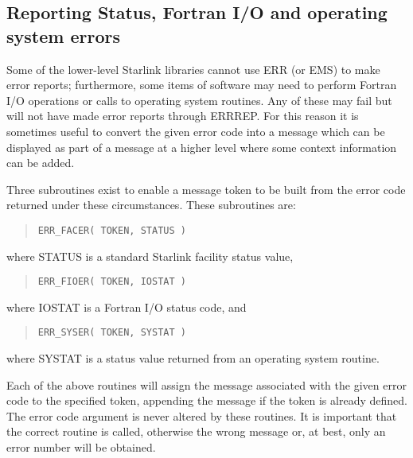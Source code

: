 \documentclass[twoside,11pt]{article}
\newcommand{\xlabel}[1]{}
\renewcommand{\_}{\texttt{\symbol{95}}}
\begin{document}
\subsection{\xlabel{reporting_status_fortran_io_and_operating_system_error}Reporting Status, Fortran I/O and operating system errors
\label{fio_sect}}
Some of the lower-level Starlink libraries cannot use ERR (or EMS) to make 
error reports; furthermore, some items of software may need to perform Fortran
I/O operations or calls to operating system routines. Any of these may fail 
but will not have made error reports through ERR\_REP.
For this reason it is sometimes useful to convert the given error code into
a message which can be displayed as part of a message at a higher level where
some context information can be added.

Three subroutines exist to enable a message token to be built from
the error code returned under these circumstances. 
These subroutines are:

\begin {quote}
\begin {small}
\begin{verbatim}
ERR_FACER( TOKEN, STATUS )
\end{verbatim}
\end {small}
\end {quote}
where STATUS is a standard Starlink facility status value,
\begin {quote}
\begin {small}
\begin{verbatim}
ERR_FIOER( TOKEN, IOSTAT )
\end{verbatim}
\end {small}
\end {quote}
where IOSTAT is a Fortran I/O status code, and
\begin {quote}
\begin {small}
\begin{verbatim}
ERR_SYSER( TOKEN, SYSTAT )
\end{verbatim}
\end {small}
\end {quote}
where SYSTAT is a status value returned from an operating system routine.

Each of the above routines will assign the message associated with the given 
error code to the specified token, appending the message if the token is already
defined. The error code argument is never altered by these routines.
It is important that the correct routine is called, otherwise the wrong message 
or, at best, only an error number will be obtained.
\end{document}
